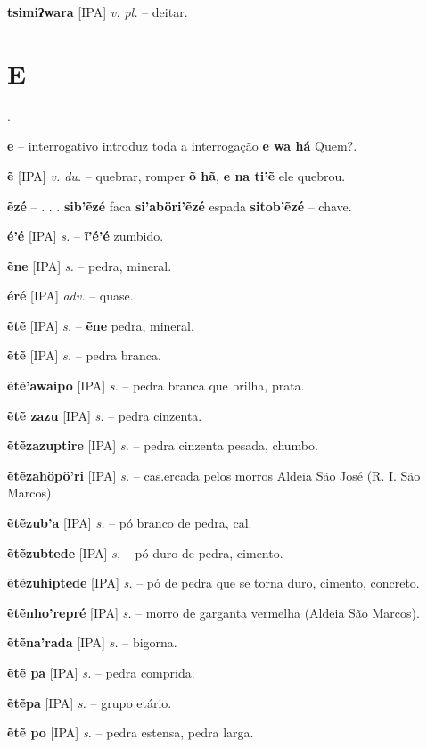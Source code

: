 \textbf{tsimiʔwara} [IPA] \textit{v. pl.} -- deitar.



\section*{E}.



\textbf{e} -- interrogativo  introduz toda a interrogação  \textbf{e wa há} Quem?.

\textbf{ẽ} [IPA] \textit{v. du.} -- quebrar, romper  \textbf{õ hã}, \textbf{e na ti'ẽ} ele quebrou.

\textbf{ẽzé} -- . . .  \textbf{sib'ẽzé} faca  \textbf{si'aböri'ẽzé} espada  \textbf{sitob'ẽzé} -- chave.

\textbf{é'é} [IPA] \textit{s.} -- \textbf{ĩ'é'é} zumbido.

\textbf{ẽne} [IPA] \textit{s.} -- pedra, mineral.

\textbf{éré} [IPA] \textit{adv.} -- quase.

\textbf{ẽtẽ} [IPA] \textit{s.} -- \textbf{ẽne} pedra, mineral.

\textbf{ẽtẽ} [IPA] \textit{s.} -- pedra branca.

\textbf{ẽtẽ'awaipo} [IPA] \textit{s.} -- pedra branca que brilha, prata.

\textbf{ẽtẽ zazu} [IPA] \textit{s.} -- pedra cinzenta.

\textbf{ẽtẽzazuptire} [IPA] \textit{s.} -- pedra cinzenta pesada, chumbo.

\textbf{ẽtẽzahöpö'ri} [IPA] \textit{s.} -- cas.ercada pelos morros  Aldeia São José (R. I. São Marcos).

\textbf{ẽtẽzub'a} [IPA] \textit{s.} -- pó branco de pedra, cal.

\textbf{ẽtẽzubtede} [IPA] \textit{s.} -- pó duro de pedra, cimento.

\textbf{ẽtẽzuhiptede} [IPA] \textit{s.} -- pó de pedra que se torna duro, cimento, concreto.

\textbf{ẽtẽnho'repré} [IPA] \textit{s.} -- morro de garganta vermelha (Aldeia São Marcos).

\textbf{ẽtẽna'rada} [IPA] \textit{s.} -- bigorna.

\textbf{ẽtẽ pa} [IPA] \textit{s.} -- pedra comprida.

\textbf{ẽtẽpa} [IPA] \textit{s.} -- grupo etário.

\textbf{ẽtẽ po} [IPA] \textit{s.} -- pedra estensa, pedra larga.

